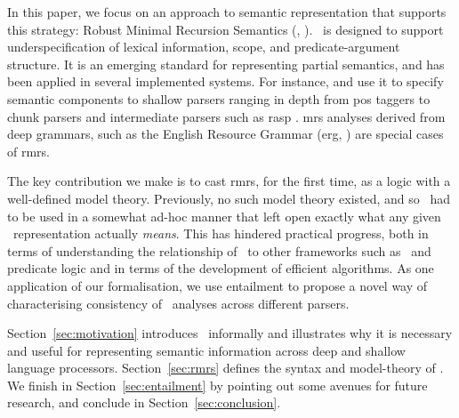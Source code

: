 In this paper, we focus on an approach to
semantic representation that supports this strategy: Robust Minimal
Recursion Semantics (\rmrs, ).
\rmrs\ is designed to support underspecification of lexical information,
scope, and predicate-argument structure.  It is an emerging standard
for representing partial semantics, and has been applied in
several implemented systems.  For instance, 
and  use it to specify semantic components to
shallow parsers ranging in depth from {\sc pos} taggers to chunk
parsers and intermediate parsers such as {\sc rasp}
\cite{briscoe:etal:2006}.  {\sc mrs} analyses
\cite{copestake:etal:2005} derived from deep grammars, such as the
English Resource Grammar ({\sc erg}, \cite{copestake:flickinger:2000})
are special cases of {\sc rmrs}.

The key contribution we make is to cast {\sc rmrs}, for the first
time, as a logic with a well-defined model theory.  Previously, no
such model theory existed, and so \rmrs\ had to be used in a somewhat
ad-hoc manner that left open exactly what any given \rmrs\
representation actually \emph{means}.  This has hindered 
practical progress, both in terms of understanding the relationship of
\rmrs\ to other frameworks such as \mrs\ and predicate logic and in
terms of the development of efficient algorithms.  As one application
of our formalisation, we use
entailment to propose a
novel way of characterising consistency of \rmrs\ analyses across
different parsers.

Section~\ref{sec:motivation} introduces \rmrs\ informally and
illustrates why it is necessary and useful for representing semantic
information across deep and shallow language processors.
Section~\ref{sec:rmrs} defines the syntax and model-theory of \rmrs.
We finish in Section~\ref{sec:entailment} by pointing out some avenues
for future research, and conclude in Section~\ref{sec:conclusion}.


